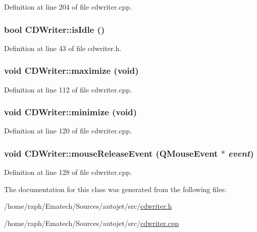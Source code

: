 Definition at line 204 of file cdwriter.cpp.\hypertarget{class_c_d_writer_ad6c510839af2c175cfabeaa3067431b}{
\subsubsection[{isIdle}]{\setlength{\rightskip}{0pt plus 5cm}bool CDWriter::isIdle ()}}
\label{class_c_d_writer_ad6c510839af2c175cfabeaa3067431b}




Definition at line 43 of file cdwriter.h.\hypertarget{class_c_d_writer_2ea8afb43e2cdcd07b0d783dcf5ac989}{
\subsubsection[{maximize}]{\setlength{\rightskip}{0pt plus 5cm}void CDWriter::maximize (void)}}
\label{class_c_d_writer_2ea8afb43e2cdcd07b0d783dcf5ac989}




Definition at line 112 of file cdwriter.cpp.\hypertarget{class_c_d_writer_a3db5f6361622dd83a529340df737c11}{
\subsubsection[{minimize}]{\setlength{\rightskip}{0pt plus 5cm}void CDWriter::minimize (void)}}
\label{class_c_d_writer_a3db5f6361622dd83a529340df737c11}




Definition at line 120 of file cdwriter.cpp.\hypertarget{class_c_d_writer_712e2295621dccbe6866a3b539a8006c}{
\subsubsection[{mouseReleaseEvent}]{\setlength{\rightskip}{0pt plus 5cm}void CDWriter::mouseReleaseEvent (QMouseEvent $\ast$ {\em event})}}
\label{class_c_d_writer_712e2295621dccbe6866a3b539a8006c}




Definition at line 128 of file cdwriter.cpp.

The documentation for this class was generated from the following files:\begin{CompactItemize}
\item 
/home/raph/Ematech/Sources/autojet/src/\hyperlink{cdwriter_8h}{cdwriter.h}\item 
/home/raph/Ematech/Sources/autojet/src/\hyperlink{cdwriter_8cpp}{cdwriter.cpp}\end{CompactItemize}
